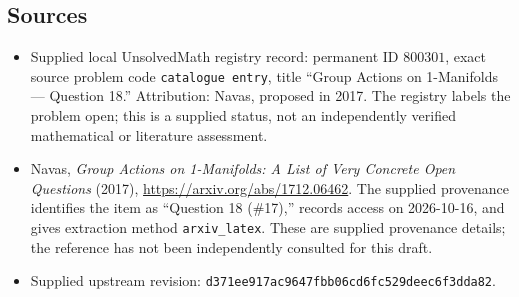 \documentclass[11pt]{article}
\begin{document}
\subsection{Sources}
\begin{itemize}
\item Supplied local UnsolvedMath registry record: permanent ID \(800301\), exact source problem code \texttt{catalogue entry}, title ``Group Actions on 1-Manifolds --- Question 18.'' Attribution: Navas, proposed in 2017. The registry labels the problem open; this is a supplied status, not an independently verified mathematical or literature assessment.
\item Navas, \emph{Group Actions on 1-Manifolds: A List of Very Concrete Open Questions} (2017), \url{https://arxiv.org/abs/1712.06462}. The supplied provenance identifies the item as ``Question 18 (\#17),'' records access on 2026-10-16, and gives extraction method \texttt{arxiv\_latex}. These are supplied provenance details; the reference has not been independently consulted for this draft.
\item Supplied upstream revision: \texttt{d371ee917ac9647fbb06cd6fc529deec6f3dda82}.
\end{itemize}
\end{document}

